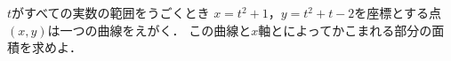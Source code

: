 \documentclass[../../main.tex]{subfiles}
\begin{document}
$t$がすべての実数の範囲をうごくとき
$x=t^2+1$，$y=t^2+t-2$を座標とする点$(x,y)$は一つの曲線をえがく．
この曲線と$x$軸とによってかこまれる部分の面積を求めよ．
\end{document}
